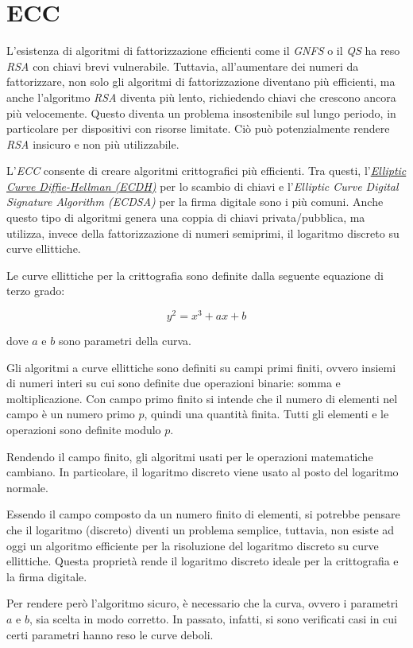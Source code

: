 \section{ECC}
L'esistenza di algoritmi di fattorizzazione efficienti come il \emph{\gls{GNFS}} o il \emph{\gls{QS}} ha reso \emph{RSA} con chiavi brevi vulnerabile.
Tuttavia, all'aumentare dei numeri da fattorizzare, non solo gli algoritmi di fattorizzazione diventano più efficienti, ma anche l'algoritmo \emph{RSA} diventa più lento, richiedendo chiavi che crescono ancora più velocemente.
Questo diventa un problema insostenibile sul lungo periodo, in particolare per dispositivi con risorse limitate.
Ciò può potenzialmente rendere \emph{RSA} insicuro e non più utilizzabile.

L'\emph{ECC} consente di creare algoritmi crittografici più efficienti.
Tra questi, l'\emph{\hyperref[cap:ecdh]{Elliptic Curve Diffie-Hellman (ECDH)}} per lo scambio di chiavi e l'\emph{Elliptic Curve Digital Signature Algorithm (ECDSA)} per la firma digitale sono i più comuni.
Anche questo tipo di algoritmi genera una coppia di chiavi privata/pubblica, ma utilizza, invece della fattorizzazione di numeri semiprimi, il logaritmo discreto su curve ellittiche.

\noindent Le curve ellittiche per la crittografia sono definite dalla seguente equazione di terzo grado:

$$y^2 = x^3 + ax + b$$

\noindent dove $a$ e $b$ sono parametri della curva.

Gli algoritmi a curve ellittiche sono definiti su campi primi finiti, ovvero insiemi di numeri interi su cui sono definite due operazioni binarie: somma e moltiplicazione.
Con campo primo finito si intende che il numero di elementi nel campo è un numero primo $p$, quindi una quantità finita. Tutti gli elementi e le operazioni sono definite modulo $p$.

Rendendo il campo finito, gli algoritmi usati per le operazioni matematiche cambiano.
In particolare, il logaritmo discreto viene usato al posto del logaritmo normale.

Essendo il campo composto da un numero finito di elementi, si potrebbe pensare che il logaritmo (discreto) diventi un problema semplice, tuttavia, non esiste ad oggi un algoritmo efficiente per la risoluzione del logaritmo discreto su curve ellittiche.
Questa proprietà rende il logaritmo discreto ideale per la crittografia e la firma digitale.

Per rendere però l'algoritmo sicuro, è necessario che la curva, ovvero i parametri $a$ e $b$, sia scelta in modo corretto. In passato, infatti, si sono verificati casi in cui certi parametri hanno reso le curve deboli.

